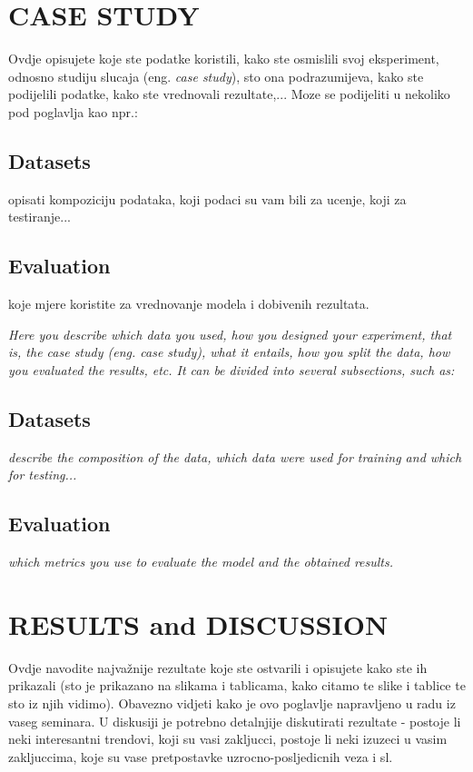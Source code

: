 \documentclass[letterpaper, 10 pt, conference]{ieeeconf}  %
\begin{document}
\section{\textbf{CASE STUDY}}

Ovdje opisujete koje ste podatke koristili, kako ste osmislili svoj eksperiment, odnosno studiju slucaja (eng. \textit{case study}), sto ona podrazumijeva, kako ste podijelili podatke, kako ste vrednovali rezultate,... Moze se podijeliti u nekoliko pod poglavlja kao npr.:

    \subsection{Datasets}
    opisati kompoziciju podataka, koji podaci su vam bili za ucenje, koji za testiranje...

    \subsection{Evaluation}
    koje mjere koristite za vrednovanje modela i dobivenih rezultata.



\textit{Here you describe which data you used, how you designed your experiment, that is, the case study (eng. case study), what it entails, how you split the data, how you evaluated the results, etc. It can be divided into several subsections, such as:}

    \subsection{Datasets}
    \textit{describe the composition of the data, which data were used for training and which for testing...}
    
    \subsection{Evaluation}
    \textit{which metrics you use to evaluate the model and the obtained results.}
    


\section{\textbf{RESULTS and DISCUSSION}}

Ovdje navodite najvažnije rezultate koje ste ostvarili i opisujete kako ste ih prikazali (sto je prikazano na slikama i tablicama, kako citamo te slike i tablice te sto iz njih vidimo). Obavezno vidjeti kako je ovo poglavlje napravljeno u radu iz vaseg seminara. 
U diskusiji je potrebno detalnjije diskutirati rezultate - postoje li neki interesantni trendovi, koji su vasi zakljucci, postoje li neki izuzeci u vasim zakljuccima, koje su vase pretpostavke uzrocno-posljedicnih veza i sl.
\end{document}
